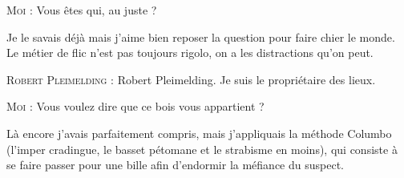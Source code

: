 \begin{dialogue}
    
\textsc{Moi} : Vous êtes qui, au juste ?
    
\end{dialogue}

%
%
Je le savais déjà mais j’aime bien reposer la question pour faire chier le monde. Le métier de flic n’est pas toujours rigolo, on a les distractions qu’on peut.

\begin{dialogue}

\textsc{Robert Pleimelding} : Robert Pleimelding. Je suis le propriétaire des lieux. 

\textsc{Moi} : Vous voulez dire que ce bois vous appartient ?

\end{dialogue}

Là encore j’avais parfaitement compris, mais j’appliquais la méthode Columbo (l’imper cradingue, le basset pétomane et le strabisme en moins), qui consiste à se faire passer pour une bille afin d’endormir la méfiance du suspect.

